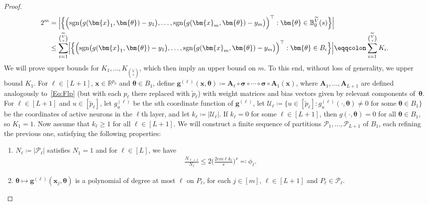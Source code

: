 \documentclass[12pt]{article}
\def\tilde{\widetilde}
\begin{document}
\begin{proof}
\begin{align}
        2^m &= \Bigl| \Bigl\{ \Bigl(\mathrm{sgn}\bigl(g(\bm{x}_1,\bm{\theta})- y_1\bigr), \ldots, \mathrm{sgn}\bigl(g(\bm{x}_m,\bm{\theta})- y_m\bigr)\Bigr)^\top : \bm{\theta}\in \mathbb{B}_0^{\tilde{V}}(s)\Bigr\} \Bigr|\nonumber\\
        &\leq \sum_{i=1}^{\binom{\tilde{V}}{s}} \Bigl| \Bigl\{ \Bigl(\mathrm{sgn}\bigl(g(\bm{x}_1,\bm{\theta})- y_1\bigr), \ldots, \mathrm{sgn}\bigl(g(\bm{x}_m,\bm{\theta})- y_m\bigr)\Bigr)^\top :  \bm{\theta}\in B_i\Bigr\} \Bigr| \eqqcolon \sum_{i=1}^{\binom{\tilde{V}}{s}} K_i. \label{eq:VC-bound-K-decomposition}
    \end{align}
    We will prove upper bounds for $K_1,\ldots,K_{\binom{\tilde{V}}{s}}$, which then imply an upper bound on $m$.  To this end, without loss of generality, we upper bound $K_1$. For $\ell\in[L+1]$, $\bm{x} \in \mathbb{R}^{p_0}$ and $\bm{\theta} \in B_1$, define $\bm{g}^{(\ell)}(\bm{x}, \bm{\theta}) \coloneqq \bm{A}_{\ell}\circ \bm{\sigma} \circ\cdots\circ \bm{\sigma}\circ \bm{A}_1(\bm{x})$, where $\bm{A}_1,\ldots,\bm{A}_{L+1}$ are defined analogously to~\eqref{Eq:Flp} (but with each $p_\ell$ there replaced with $\tilde{p}_\ell$) with weight matrices and bias vectors given by relevant components of~$\bm{\theta}$.  For $\ell \in [L+1]$ and $u\in[\tilde{p}_{\ell}]$, let $g^{(\ell)}_u$ be the $u$th coordinate function of $\bm g^{(\ell)}$, let $\mathcal{U}_\ell\coloneqq \{u\in[\tilde{p}_\ell] : g^{(\ell)}_u(\cdot,\bm\theta) \neq 0 \text{ for some } \bm\theta \in B_1\}$ be the coordinates of active neurons in the $\ell$th layer, and let $k_\ell \coloneqq |\mathcal{U}_\ell|$.  If $k_\ell = 0$ for some $\ell\in[L+1]$, then $g(\cdot,\bm\theta) = 0$ for all $\bm\theta \in B_1$, so $K_1=1$. Now assume that $k_\ell \geq 1$ for all $\ell\in[L+1]$.  We will construct a finite sequence of partitions    
    $\mathcal{P}_1,\ldots,\mathcal{P}_{L+1}$ of $B_1$, each refining the previous one, satisfying the following properties:
    \begin{enumerate}[label=(\roman*)]%
        \item \label{property1}$N_\ell \coloneqq |\mathcal{P}_\ell|$ satisfies $N_1 = 1$ and for $\ell\in [L]$, we have
        \begin{align*}
            \frac{N_{\ell+1}}{N_{\ell}} \leq 2\biggl( \frac{2em \ell k_{\ell}}{s} \biggr)^s \eqqcolon \phi_{\ell}.
        \end{align*}
        \item \label{property2} $\bm\theta \mapsto \bm g^{(\ell)}(\bm x_j, \bm\theta)$ is a polynomial of degree at most $\ell$ on $P_{\ell}$, for each $j\in[m]$, $\ell\in[L+1]$ and $P_\ell \in \mathcal{P}_\ell$.

\end{enumerate}
\end{proof}
\end{document}
